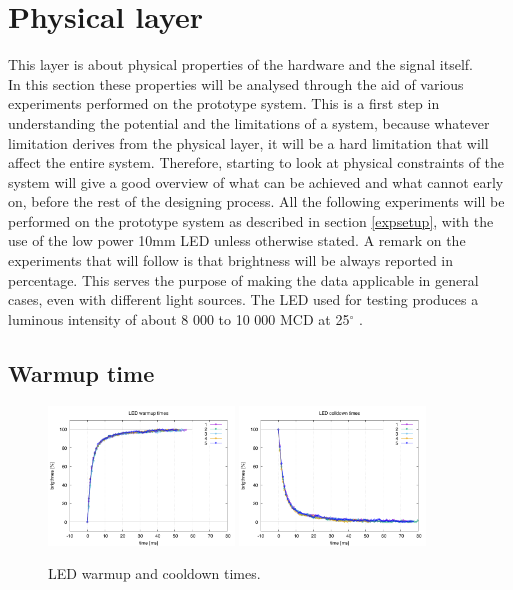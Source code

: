 \section{Physical layer}
\label{physical}
This layer is about physical properties of the hardware and the signal itself.\\
In this section these properties will be analysed through the aid of various experiments performed on the prototype system.
This is a first step in understanding the potential and the limitations of a system, because whatever limitation derives from the physical layer, it will be a hard limitation that will affect the entire system.
Therefore, starting to look at physical constraints of the system will give a good overview of what can be achieved and what cannot early on, before the rest of the designing process.
All the following experiments will be performed on the prototype system as described in section \ref{expsetup}, with the use of the low power 10mm LED unless otherwise stated.
A remark on the experiments that will follow is that brightness will be always reported in percentage.
This serves the purpose of making the data applicable in general cases, even with different light sources.
The LED used for testing produces a luminous intensity of about 8 000 to 10 000 MCD at 25$^{\circ}$ .

\subsection{Warmup time}

\begin{figure}[h]
\centering
\includegraphics[height=140px]{img/warmup1}
\includegraphics[height=140px]{img/warmdown1}
\caption{LED warmup and cooldown times.}
\label{fig:warmup}
\end{figure}

